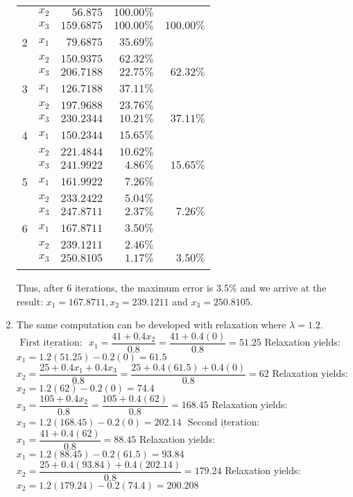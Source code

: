 \documentclass[../main.tex]{subfiles}
\begin{document}
\begin{enumerate}[label=\bfseries(\alph*)]
\begin{tabular}{ccrrr}
 & $x_{2}$ & $56.875$ & $100.00 \%$ &  \\
 & $x_{3}$ & $159.6875$ & $100.00 \%$ & $100.00 \%$ \\
\hline
2 & $x_{1}$ & $79.6875$ & $35.69 \%$ &  \\
 & $x_{2}$ & $150.9375$ & $62.32 \%$ &  \\
 & $x_{3}$ & $206.7188$ & $22.75 \%$ & $62.32 \%$ \\
\hline
3 & $x_{1}$ & $126.7188$ & $37.11 \%$ &  \\
 & $x_{2}$ & $197.9688$ & $23.76 \%$ &  \\
 & $x_{3}$ & $230.2344$ & $10.21 \%$ & $37.11 \%$ \\
\hline
4 & $x_{1}$ & $150.2344$ & $15.65 \%$ &  \\
 & $x_{2}$ & $221.4844$ & $10.62 \%$ &  \\
 & $x_{3}$ & $241.9922$ & $4.86 \%$ & $15.65 \%$ \\
\hline
5 & $x_{1}$ & $161.9922$ & $7.26 \%$ &  \\
 & $x_{2}$ & $233.2422$ & $5.04 \%$ &  \\
 & $x_{3}$ & $247.8711$ & $2.37 \%$ & $7.26 \%$ \\
\hline
6 & $x_{1}$ & $167.8711$ & $3.50 \%$ &  \\
 & $x_{2}$ & $239.1211$ & $2.46 \%$ &  \\
 & $x_{3}$ & $250.8105$ & $1.17 \%$ & $3.50 \%$ \\
\Xhline{1.5pt}
\end{tabular}
\bigbreak
Thus, after 6 iterations, the maximum error is $3.5 \%$ and we arrive at the result: $x_{1}=$\smallbreak $167.8711, x_{2}=239.1211$ and $x_{3}=250.8105$.
\bigbreak
\item The same computation can be developed with relaxation where $\lambda=1.2$.
\bigbreak
$\underline{\text { First iteration: }}$
\bigbreak
$x_{1}=\dfrac{41+0.4 x_{2}}{0.8}=\dfrac{41+0.4(0)}{0.8}=51.25$
\bigbreak
Relaxation yields: $x_{1}=1.2(51.25)-0.2(0)=61.5$
\bigbreak
$x_{2}=\dfrac{25+0.4 x_{1}+0.4 x_{3}}{0.8}=\dfrac{25+0.4(61.5)+0.4(0)}{0.8}=62$
\bigbreak
Relaxation yields: $x_{2}=1.2(62)-0.2(0)=74.4$
\bigbreak
$x_{3}=\dfrac{105+0.4 x_{2}}{0.8}=\dfrac{105+0.4(62)}{0.8}=168.45$
\bigbreak
Relaxation yields: $x_{3}=1.2(168.45)-0.2(0)=202.14$
\bigbreak
$\underline{\text { Second iteration: }}$
\bigbreak
$x_{1}=\dfrac{41+0.4(62)}{0.8}=88.45$
\bigbreak
Relaxation yields: $x_{1}=1.2(88.45)-0.2(61.5)=93.84$
\bigbreak
$x_{2}=\dfrac{25+0.4(93.84)+0.4(202.14)}{0.8}=179.24$
\bigbreak
Relaxation yields: $x_{2}=1.2(179.24)-0.2(74.4)=200.208$

\end{enumerate}
\end{document}
